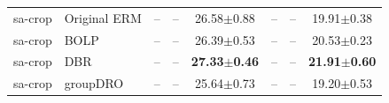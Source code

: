 \documentclass[11pt]{article}
\begin{document}
\begin{table}[h!]
{\begin{tabular}{llcccccc}
sa-crop & Original ERM & -- & -- & 26.58$\pm$0.88 & -- & -- & 19.91$\pm$0.38 \\
sa-crop & BOLP & -- & -- & 26.39$\pm$0.53 & -- & -- & 20.53$\pm$0.23 \\
sa-crop & DBR & -- & -- & \textbf{27.33$\pm$0.46} & -- & -- & \textbf{21.91$\pm$0.60} \\
sa-crop & groupDRO & -- & -- & 25.64$\pm$0.73 & -- & -- & 19.20$\pm$0.53 \\
\bottomrule
\end{tabular}%
}
\end{table}
\end{document}
